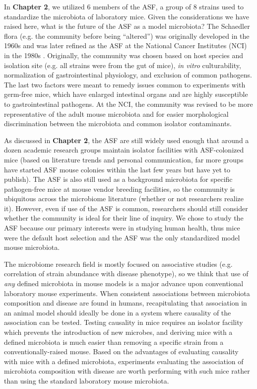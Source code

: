 \documentclass[11pt,onecolumn,notitlepage,openany,twoside]{book}
\begin{document}
\begin{refsection}
In \textbf{Chapter 2}, we utilized 6 members of the ASF, a group of 8 strains used to standardize the microbiota of laboratory mice. Given the considerations we have raised here, what is the future of the ASF as a model microbiota? The Schaedler flora (e.g. the community before being “altered”) was originally developed in the 1960s \cite{Schaedler1965-tg} and was later refined as the ASF at the National Cancer Institutes (NCI) in the 1980s \cite{Wymore_Brand2015-ez}. Originally, the community was chosen based on host species and isolation site (e.g. all strains were from the gut of mice), \textit{in vitro} culturability, normalization of gastrointestinal physiology, and exclusion of common pathogens. The last two factors were meant to remedy issues common to experiments with germ-free mice, which have enlarged intestinal organs and are highly susceptible to gastrointestinal pathogens. At the NCI, the community was revised to be more representative of the adult mouse microbiota and for easier morphological discrimination between the microbiota and common isolator contaminants.

As discussed in \textbf{Chapter 2}, the ASF are still widely used enough that around a dozen academic research groups maintain isolator facilities with ASF-colonized mice (based on literature trends and personal communication, far more groups have started ASF mouse colonies within the last few years but have yet to publish). The ASF is also still used as a background microbiota for specific pathogen-free mice at mouse vendor breeding facilities, so the community is ubiquitous across the microbiome literature (whether or not researchers realize it). However, even if use of the ASF is common, researchers should still consider whether the community is ideal for their line of inquiry. We chose to study the ASF because our primary interests were in studying human health, thus mice were the default host selection and the ASF was the only standardized model mouse microbiota.

The microbiome research field is mostly focused on associative studies (e.g. correlation of strain abundance with disease phenotype), so we think that use of \textit{any} defined microbiota in mouse models is a major advance upon conventional laboratory mouse experiments. When consistent associations between microbiota composition and disease are found in humans, recapitulating that association in an animal model should ideally be done in a system where causality of the association can be tested. Testing causality in mice requires an isolator facility which prevents the introduction of new microbes, and deriving mice with a defined microbiota is much easier than removing a specific strain from a conventionally-raised mouse. Based on the advantages of evaluating causality with mice with a defined microbiota, experiments evaluating the association of microbiota composition with disease are worth performing with such mice rather than using the standard laboratory mouse microbiota.


\end{refsection}
\end{document}
